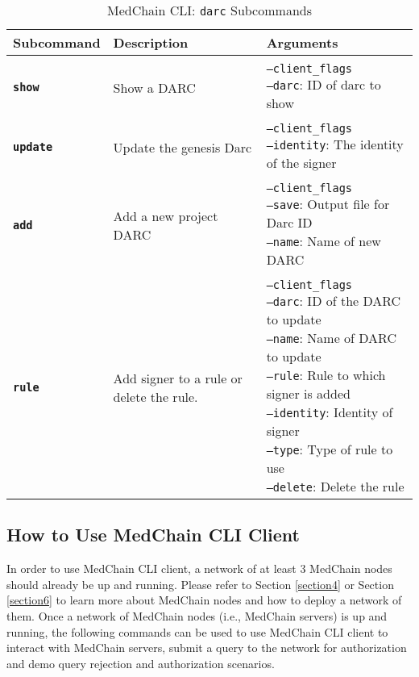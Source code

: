 \begin{table}[ht]
\centering
\caption{MedChain CLI: \texttt{darc} Subcommands}
\label{tbl:darc-cli}
\begin{tabular}{|l|l|l|}
\hline
\textbf{Subcommand} & \textbf{Description} & \textbf{Arguments}\\
\hline
\\[-1em]
\textbf{\texttt{show}}    &  Show a DARC & \pbox{20cm}{ \texttt{--client\_flags} \\ \texttt{--darc}: ID of darc to show\\[1pt]} \\ 
\hline
\\[-1em]
\textbf{\texttt{update}} & Update the genesis Darc  &  \pbox{20cm}{ \texttt{--client\_flags} \\ \texttt{--identity}: The identity of the signer \\[1pt]} \\
\hline
\\[-1em]
\textbf{\texttt{add}} & Add a new project DARC & \pbox{20cm}{ \texttt{--client\_flags} \\ \texttt{--save}: Output file for Darc ID  \\ \texttt{--name}: Name of new DARC \\[1pt]} \\
\hline
\\[-1em]
\textbf{\texttt{rule}} & Add signer to a rule or delete the rule.  & \pbox{20cm}{ \texttt{--client\_flags} \\ \texttt{--darc}: ID of the DARC to update \\ \texttt{--name}: Name of DARC to update \\ \texttt{--rule}: Rule to which signer is added  \\ \texttt{--identity}: Identity of signer \\ \texttt{--type}: Type of rule to use \\ \texttt{--delete}: Delete the rule \\[1pt]}\\
\hline
\end{tabular}
\end{table}

\subsection{How to Use MedChain CLI Client}
In order to use MedChain CLI client, a network of at least 3 MedChain nodes should already be up and running. Please refer to Section \ref{section4} or Section \ref{section6} to learn more about MedChain nodes and how to deploy a network of them. 
Once a network of MedChain nodes (i.e., MedChain servers) is up and running, the following commands can be used to use MedChain CLI client to interact with MedChain servers, submit a query to the network for authorization and demo query rejection and authorization scenarios. 

